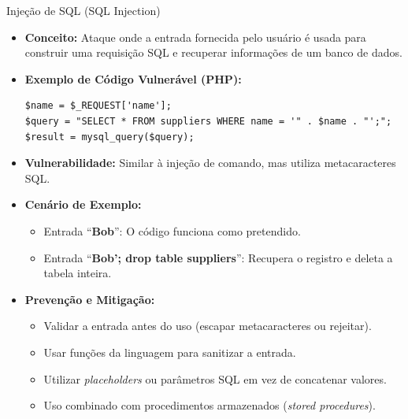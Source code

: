 \begin{frame}[fragile]{Injeção de SQL (SQL Injection)}
    \begin{itemize}
        \item \textbf{Conceito:} Ataque onde a entrada fornecida pelo usuário é usada para construir uma requisição SQL e recuperar informações de um banco de dados.
        \item \textbf{Exemplo de Código Vulnerável (PHP):}
              \begin{verbatim}
$name = $_REQUEST['name'];
$query = "SELECT * FROM suppliers WHERE name = '" . $name . "';";
$result = mysql_query($query);
        \end{verbatim}
        \item \textbf{Vulnerabilidade:} Similar à injeção de comando, mas utiliza metacaracteres SQL.
        \item \textbf{Cenário de Exemplo:}
              \begin{itemize}
                  \item Entrada ``\textbf{Bob}'': O código funciona como pretendido.
                  \item Entrada ``\textbf{Bob'; drop table suppliers}'': Recupera o registro e deleta a tabela inteira.
              \end{itemize}
        \item \textbf{Prevenção e Mitigação:}
              \begin{itemize}
                  \item Validar a entrada antes do uso (escapar metacaracteres ou rejeitar).
                  \item Usar funções da linguagem para sanitizar a entrada.
                  \item Utilizar \textit{placeholders} ou parâmetros SQL em vez de concatenar valores.
                  \item Uso combinado com procedimentos armazenados (\textit{stored procedures}).
              \end{itemize}
    \end{itemize}
\end{frame}

